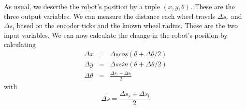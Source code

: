 As usual, we describe the robot's position by a tuple $ (x,y,\theta)$. These are the three output variables. We can measure the distance each wheel travels $ \Delta s_r$ and $ \Delta s_l$ based on the encoder ticks and the known wheel radius. These are the two input variables. We can now calculate the change in the robot's position by calculating
\begin{eqnarray}
\Delta x  &=& \Delta s cos(\theta+\Delta \theta /2)\\
\Delta y  &=& \Delta s sin(\theta+\Delta \theta/2)\\
\Delta \theta &=& \frac{\Delta s_r-\Delta s_l}{2}
\end{eqnarray}
with
\begin{equation}
\Delta s=\frac{\Delta s_r + \Delta s_l}{2}
\end{equation}

